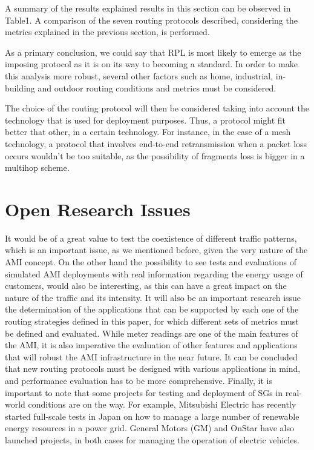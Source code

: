 \documentclass[11pt,final,onecolumn]{IEEEtran}
\begin{document}
A summary of the results explained results in this section can be observed in Table1. A comparison of the seven routing protocols described, considering the metrics explained in the previous section, is performed. 

As a primary conclusion, we could say that RPL is most likely to emerge as the imposing protocol as it is on its way to becoming a standard. In order to make this analysis more robust, several other factors such as home, industrial, in-building and outdoor routing conditions and metrics must be considered.

The choice of the routing protocol will then be considered taking into account the technology that is used for deployment purposes. Thus, a protocol might fit better that other, in a certain technology. For instance, in the case of a mesh technology, a protocol that involves end-to-end retransmission when a packet loss occurs wouldn’t be too suitable, as the possibility of fragments loss is bigger in a multihop scheme. 



\section{Open Research Issues}\label{issues}
It would be of a great value to test the coexistence of different traffic patterns, which is an important issue, as we mentioned before, given the very nature of the AMI concept. On the other hand the possibility to see tests and evaluations of simulated AMI deployments with real information regarding the energy usage of customers, would also be interesting, as this can have a great impact on the nature of the traffic and its intensity. It will also be an important research issue the determination of the applications that can be supported by each one of the routing strategies defined in this paper, for which different sets of metrics must be defined and evaluated. While meter readings are one of the main features of the AMI, it is also imperative the evaluation of other features and applications that will robust the AMI infrastructure in the near future. It can be concluded that new routing protocols must be designed with various applications in mind, and performance evaluation has to be more comprehensive. Finally, it is important to note that some projects for testing and deployment of SGs in real-world conditions are on the way. For example, Mitsubishi Electric has recently started full-scale tests in Japan on how to manage a large number of renewable energy resources in a power grid. General Motors (GM) and OnStar have also launched projects, in both cases for managing the operation of electric vehicles.
\end{document}
